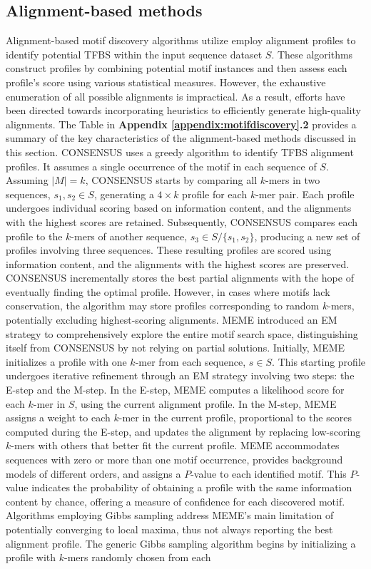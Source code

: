 \documentclass[a4paper, titlepage, openright]{book}
\begin{document}
\subsection{Alignment-based methods}
Alignment-based motif discovery algorithms utilize employ alignment profiles to identify potential TFBS within the input sequence dataset $S$. These algorithms construct profiles by combining potential motif instances and then assess each profile's score using various statistical measures. However, the exhaustive enumeration of all possible alignments is impractical. As a result, efforts have been directed towards incorporating heuristics to efficiently generate high-quality alignments. The Table in \textbf{Appendix \ref{appendix:motifdiscovery}.2} provides a summary of the key characteristics of the alignment-based methods discussed in this section. CONSENSUS \citep{hertz1999identifying} uses a greedy algorithm to identify TFBS alignment profiles. It assumes a single occurrence of the motif in each sequence of $S$. Assuming $|M|=k$, CONSENSUS starts by comparing all $k$-mers in two sequences, $s_{1}, s_{2} \in S$, generating a $4 \times k$ profile for each $k$-mer pair. Each profile undergoes individual scoring based on information content, and the alignments with the highest scores are retained. Subsequently, CONSENSUS compares each profile to the $k$-mers of another sequence, $s_{3} \in S/\{s_{1},s_{2}\}$, producing a new set of profiles involving three sequences. These resulting profiles are scored using information content, and the alignments with the highest scores are preserved. CONSENSUS incrementally stores the best partial alignments with the hope of eventually finding the optimal profile. However, in cases where motifs lack conservation, the algorithm may store profiles corresponding to random $k$-mers, potentially excluding highest-scoring alignments. MEME \citep{bailey1994fitting,bailey1995value,bailey2006meme} introduced an EM strategy to comprehensively explore the entire motif search space, distinguishing itself from CONSENSUS by not relying on partial solutions. Initially, MEME initializes a profile with one $k$-mer from each sequence, $s \in S$. This starting profile undergoes iterative refinement through an EM strategy involving two steps: the E-step and the M-step. In the E-step, MEME computes a likelihood score for each $k$-mer in $S$, using the current alignment profile. In the M-step, MEME assigns a weight to each $k$-mer in the current profile, proportional to the scores computed during the E-step, and updates the alignment by replacing low-scoring $k$-mers with others that better fit the current profile. MEME accommodates sequences with zero or more than one motif occurrence, provides background models of different orders, and assigns a $P$-value to each identified motif. This $P$-value indicates the probability of obtaining a profile with the same information content by chance, offering a measure of confidence for each discovered motif. Algorithms employing Gibbs sampling address MEME’s main limitation of potentially converging to local maxima, thus not always reporting the best alignment profile. The generic Gibbs sampling algorithm begins by initializing a profile with $k$-mers randomly chosen from each 
\end{document}
